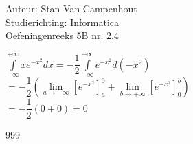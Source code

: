 \documentclass[a4paper]{article}
\begin{document}
  
\noindent \large Auteur: Stan Van Campenhout \\
\noindent \large Studierichting:  Informatica\\
\noindent \large Oefeningenreeks 5B nr. 2.4\\

\medskip

\normalsize

$ \displaystyle\int\limits_{-\infty}^{+\infty}xe^{-x^2}dx = -\dfrac{1}{2}\displaystyle\int\limits_{-\infty}^{+\infty}e^{-x^2}d\left(-x^2\right) $\\

 $ = -\dfrac{1}{2}\left(\lim\limits_{a\rightarrow-\infty}\left[e^{-x^2}\right]_a^0+\lim\limits_{b\rightarrow+\infty}\left[e^{-x^2}\right]_0^b\right) $\\

$ = -\dfrac{1}{2}\left(0+0\right) = 0 $\\


\begin{thebibliography}{999}
\end{thebibliography}
\end{document}
